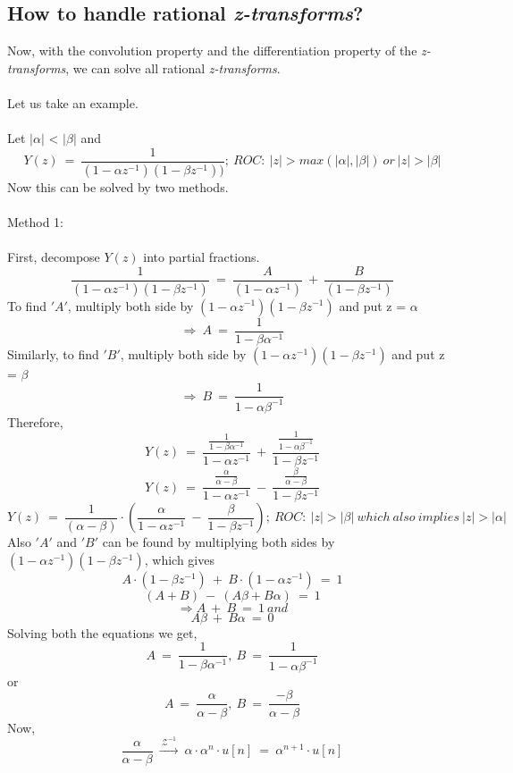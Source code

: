 \subsection{How to handle rational \textit{z-transforms}?}
Now, with the convolution property and the differentiation property of the \textit{z-transforms}, we can solve all rational \textit{z-transforms}.\\\\
Let us take an example.\\ \\
Let $|\alpha|$ < $|\beta|$ and\\
\[
Y(z)\ =\ \frac{1}{(1 - \alpha z^{-1})(1 - \beta z^{-1}))};\ ROC:\ |z| > max(|\alpha|,|\beta|)\ or\ |z| > |\beta|
\]
Now this can be solved by two methods.\\\\
Method 1:\\\\
First, decompose $Y(z)$ into partial fractions.
\[
\frac{1}{(1 - \alpha z^{-1})(1 - \beta z^{-1})}\ =\ \frac{A}{(1 - \alpha z^{-1})}\ +\ \frac{B}{(1 - \beta z^{-1})}
\]
To find $'A'$, multiply both side by $(1 - \alpha z^{-1})(1 - \beta z^{-1})$ and put z = $\alpha$ \\
\[
\Rightarrow \ A\ =\ \frac{1}{1 - \beta\alpha^{-1}}
\]
Similarly, to find $'B'$, multiply both side by $(1 - \alpha z^{-1})(1 - \beta z^{-1})$ and put z = $\beta$ \\
\[
\Rightarrow \ B\ =\ \frac{1}{1 - \alpha\beta^{-1}}
\]
Therefore,
\[
Y(z)\ =\ \frac{\frac{1}{1 - \beta\alpha^{-1}}}{1 - \alpha z^{-1}}\ +\ \frac{\frac{1}{1 - \alpha\beta^{-1}}}{1 - \beta z^{-1}}
\]
\[
Y(z)\ =\ \frac{\frac{\alpha}{\alpha - \beta}}{1 - \alpha z^{-1}}\ -\ \frac{\frac{\beta}{\alpha - \beta}}{1 - \beta z^{-1}}
\]
\[
Y(z)\ =\ \frac{1}{(\alpha - \beta)}\cdot (\frac{\alpha}{1 - \alpha z^{-1}}\ -\ \frac{\beta}{1 - \beta z^{-1}});\ ROC:\ |z| > |\beta|\ which\ also\ implies\ |z| > |\alpha|
\]
Also $'A'$ and $'B'$ can be found by multiplying both sides by $(1 - \alpha z^{-1})(1 - \beta z^{-1})$, which gives
\[
A\cdot(1 - \beta z^{-1})\ +\ B\cdot(1 - \alpha z^{-1})\ =\ 1
\]
\[
(A + B)\ -\ (A\beta + B\alpha)\ =\ 1
\]
\[
\Rightarrow A\ +\ B\ =\ 1\ and
\]
\[
A\beta\ +\ B\alpha \ =\ 0
\]
Solving both the equations we get,\\
\[
A\ =\ \frac{1}{1 - \beta\alpha^{-1}},\ B\ =\ \frac{1}{1 - \alpha\beta^{-1}}
\]
or
\[
A\ =\ \frac{\alpha}{\alpha - \beta},\ B\ =\ \frac{-\beta}{\alpha - \beta}
\]
Now,
\[
\frac{\alpha}{\alpha - \beta}\ \xrightarrow{\ \mathcal{Z}^{-1}\ }\ \alpha \cdot \alpha^n \cdot u[n]\ =\ \alpha^{n+1}\cdot u[n]
\]
